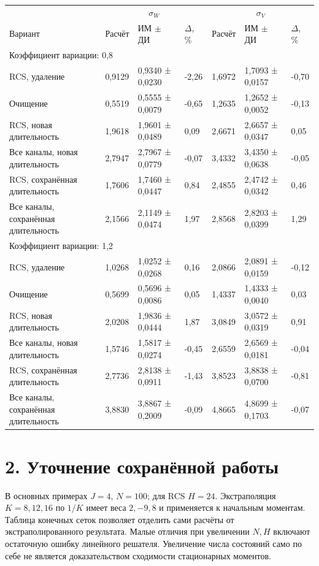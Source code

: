 \setlength{\tabcolsep}{2pt}
\begin{tabular}{p{4.16cm}p{1.61cm}p{2.83cm}p{1.28cm}p{1.61cm}p{2.83cm}p{1.28cm}}
\toprule
 & \multicolumn{3}{c}{$\sigma_W$} & \multicolumn{3}{c}{$\sigma_V$} \\
Вариант & Расчёт & ИМ $\pm$ ДИ & $\Delta$, \% & Расчёт & ИМ $\pm$ ДИ & $\Delta$, \% \\
\midrule
\multicolumn{7}{l}{Коэффициент вариации: 0,8} \\
RCS, удаление & 0,9129 & 0,9340 ± 0,0230 & -2,26 & 1,6972 & 1,7093 ± 0,0157 & -0,70 \\
Очищение & 0,5519 & 0,5555 ± 0,0079 & -0,65 & 1,2635 & 1,2652 ± 0,0052 & -0,13 \\
RCS, новая длительность & 1,9618 & 1,9601 ± 0,0489 & 0,09 & 2,6671 & 2,6657 ± 0,0347 & 0,05 \\
Все каналы, новая длительность & 2,7947 & 2,7967 ± 0,0779 & -0,07 & 3,4332 & 3,4350 ± 0,0638 & -0,05 \\
RCS, сохранённая длительность & 1,7606 & 1,7460 ± 0,0447 & 0,84 & 2,4855 & 2,4742 ± 0,0342 & 0,46 \\
Все каналы, сохранённая длительность & 2,1566 & 2,1149 ± 0,0474 & 1,97 & 2,8568 & 2,8203 ± 0,0399 & 1,29 \\
\multicolumn{7}{l}{Коэффициент вариации: 1,2} \\
RCS, удаление & 1,0268 & 1,0252 ± 0,0268 & 0,16 & 2,0866 & 2,0891 ± 0,0159 & -0,12 \\
Очищение & 0,5699 & 0,5696 ± 0,0086 & 0,05 & 1,4337 & 1,4333 ± 0,0040 & 0,03 \\
RCS, новая длительность & 2,0208 & 1,9836 ± 0,0444 & 1,87 & 3,0849 & 3,0572 ± 0,0319 & 0,91 \\
Все каналы, новая длительность & 1,5746 & 1,5817 ± 0,0274 & -0,45 & 2,6559 & 2,6569 ± 0,0181 & -0,04 \\
RCS, сохранённая длительность & 2,7736 & 2,8138 ± 0,0911 & -1,43 & 3,8523 & 3,8838 ± 0,0700 & -0,81 \\
Все каналы, сохранённая длительность & 3,8830 & 3,8867 ± 0,2009 & -0,09 & 4,8665 & 4,8699 ± 0,1703 & -0,07 \\
\bottomrule
\end{tabular}




\section*{2. Уточнение сохранённой работы}
В основных примерах \(J=4\), \(N=100\); для RCS \(H=24\). Экстраполяция \(K=8,12,16\) по \(1/K\) имеет веса \(2,-9,8\) и применяется к начальным моментам. Таблица конечных сеток позволяет отделить сами расчёты от экстраполированного результата. Малые отличия при увеличении \(N,H\) включают остаточную ошибку линейного решателя. Увеличение числа состояний само по себе не является доказательством сходимости стационарных моментов.

